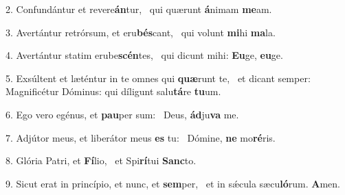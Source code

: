 2. Confundántur et revere\textbf{án}tur, \ast\  qui quærunt \textbf{á}nimam \textbf{me}am.\

3. Avertántur retrórsum, et eru\textbf{bés}cant, \ast\  qui volunt \textbf{mi}hi \textbf{ma}la.\

4. Avertántur statim erube\textbf{scén}tes, \ast\  qui dicunt mihi: \textbf{Eu}ge, \textbf{eu}ge.\

5. Exsúltent et læténtur in te omnes qui \textbf{quæ}runt te, \ast\  et dicant semper: Magnificétur Dóminus: qui díligunt salu\textbf{tá}re \textbf{tu}um.\

6. Ego vero egénus, et \textbf{pau}per sum: \ast\  Deus, \textbf{ád}ju\textbf{va} me.\

7. Adjútor meus, et liberátor meus \textbf{es} tu: \ast\  Dómine, \textbf{ne} mo\textbf{ré}ris.\

8. Glória Patri, et \textbf{Fí}lio, \ast\  et Spi\textbf{rí}tui \textbf{Sanc}to.\

9. Sicut erat in princípio, et nunc, et \textbf{sem}per, \ast\  et in sǽcula sæcu\textbf{ló}rum. \textbf{A}men.\

